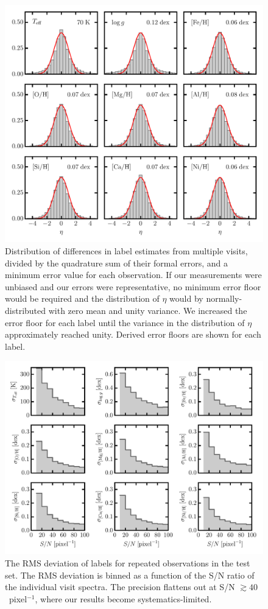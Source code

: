 \documentclass[preprint]{aastex61}
\begin{document}
\begin{figure}[p]
\includegraphics[width=\textwidth]{figures/pairwise-metrics.pdf}
\caption{Distribution of differences in label estimates from multiple visits, divided by the quadrature sum of their formal errors, and a minimum error value for each observation.  If our measurements were unbiased and our errors were representative, no minimum error floor would be required and the distribution of $\eta$ would by normally-distributed with zero mean and unity variance. 
We increased the error floor for each label until the variance in the distribution of $\eta$ approximately reached unity. Derived error floors are shown for each label.\label{fig:pairwise-comparison}}
\end{figure}


\begin{figure}[p]
\includegraphics[width=\textwidth]{figures/repeat-visits.pdf}
\caption{The RMS deviation of labels for repeated observations in the test set.  The RMS deviation is binned as a function of the S/N ratio of the individual visit spectra.  The
precision flattens out at S/N $\gtrsim 40$~pixel$^{-1}$, where our results become systematics-limited.
\label{fig:repeat-visits}}
\end{figure}
\end{document}
